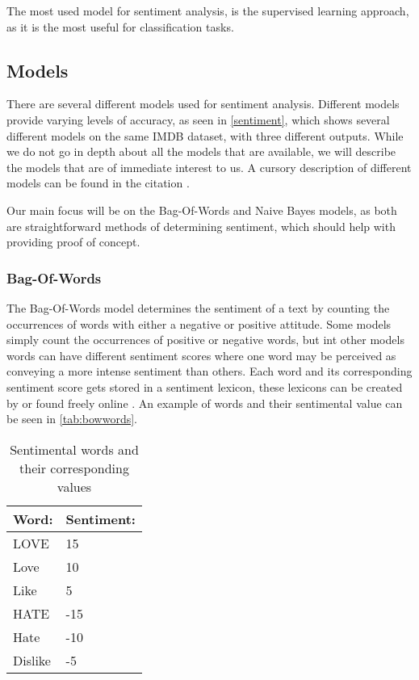 The most used model for sentiment analysis, is the supervised learning approach,
as it is the most useful for classification tasks.

\subsection{Models}\label{subsub:Models}
There are several different models used for sentiment analysis. Different models
provide varying levels of accuracy, as seen in \autoref{sentiment}, which shows
several different models on the same IMDB dataset, with three different outputs.
While we do not go in depth about all the models that are available, we will
describe the models that are of immediate interest to us. A cursory description
of different models can be found in the citation \citep{Classification}.


Our main focus will be on the Bag-Of-Words and Naive Bayes models, as both
are straightforward methods of determining sentiment, which should help with
providing proof of concept.

\subsubsection{Bag-Of-Words}
The Bag-Of-Words model determines the sentiment of a text by counting the
occurrences of words with either a negative or positive attitude. Some models
simply count the occurrences of positive or negative words, but int other models
words can have different sentiment scores where one word may be perceived as
conveying a more intense sentiment than others. Each word and its corresponding
sentiment score gets stored in a sentiment lexicon, these lexicons can be
created by or found freely online \citep{BagOfWords}. An example of words and
their sentimental value can be seen in \autoref{tab:bowwords}.

\begin{table}[H]\centering
\begin{tabular}{|l|l|}\hline
\textbf{Word:} & \textbf{Sentiment:} \\\hline
LOVE	&	15	\\\hline
Love	&	10	\\\hline
Like	&	5	\\\hline
HATE	&	-15	\\\hline
Hate	&	-10	\\\hline
Dislike	&	-5	\\\hline
\end{tabular}
\caption{Sentimental words and their corresponding values}
\label{tab:bowwords}
\end{table}

